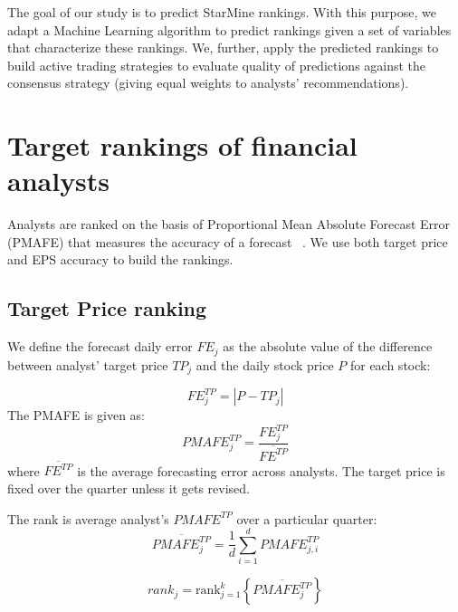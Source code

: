 \documentclass[a4paper,12pt,openright,notitlepage]{report}\usepackage[]{graphicx}\usepackage[]{color}
\begin{document}
The goal of our study is to predict  StarMine rankings. With this purpose, we adapt a Machine Learning  algorithm to predict rankings  given a set of variables that characterize these rankings. We, further, apply the predicted rankings  to build active trading strategies to evaluate quality of predictions against the consensus strategy (giving equal weights to analysts' recommendations).






\section{Target rankings of financial analysts}
\label{ch4:sec-tr}
 Analysts are ranked on the basis of Proportional Mean Absolute Forecast Error (PMAFE) that measures the accuracy of a forecast ~\citep{clement1999,brown2001,ertimur2007}. We use both target price and EPS accuracy to build the rankings.

\subsection{Target Price ranking}
\label{ch4:rank}
 We define the forecast daily error  $FE_{j}$ as the absolute value of the difference between analyst' target price $TP_{j}$ and the daily stock price $P$ for each stock:

\begin{equation}
	\label{ch4-dfe}
	FE_{j}^{TP}=|{P-TP_{j}}|
\end{equation}
The PMAFE is given as:
\begin{equation}
	\label{ch4-tp:pmafe}
	PMAFE_{j}^{TP}=\frac{FE_{j}^{TP}}{\overline{FE^{TP}}}
\end{equation}
where $\overline{{FE}^{TP}}$ is the average forecasting error across analysts. The target price is fixed over the quarter unless it gets revised.

The rank is average analyst's $PMAFE^{TP}$ over a particular quarter:
\begin{equation}
	\overline{PMAFE_{j}^{TP}}=\frac{1}{d} \sum_{i=1}^{d} PMAFE_{j,i}^{TP}
\end{equation}

\begin{equation}
	\label{ch4-tp:rank}
	rank_{j}=\mathrm{rank}_{j=1}^{k} \left\{ \overline{PMAFE_{j}^{TP}} \right\}
\end{equation}
\end{document}
